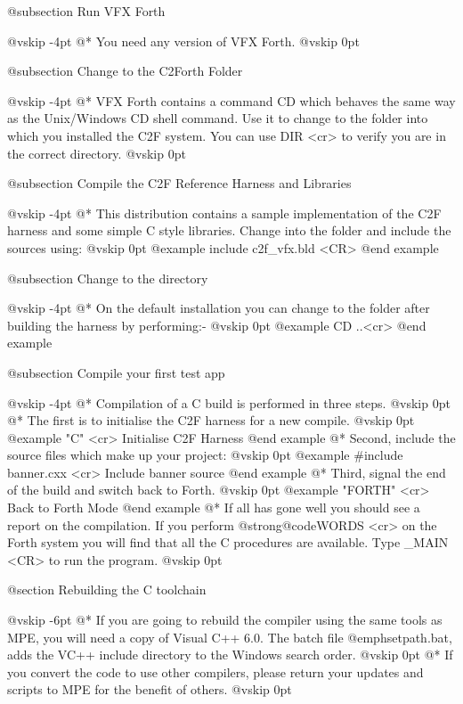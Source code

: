 @subsection Run VFX Forth


@vskip -4pt
@*
You need any version of VFX Forth.
@vskip 0pt

@subsection Change to the C2Forth Folder


@vskip -4pt
@*
VFX Forth contains a command CD which behaves the same way as the
Unix/Windows CD shell command. Use it to change to the folder
into which you installed the C2F system. You can use DIR <cr> to
verify you are in the correct directory.
@vskip 0pt

@subsection Compile the C2F Reference Harness and Libraries


@vskip -4pt
@*
This distribution contains a sample implementation of the C2F
harness and some simple C style libraries. Change into the \HARNESS
folder and include the sources using:
@vskip 0pt
@example
  include c2f_vfx.bld <CR> @end example

@subsection Change to the \TESTS directory


@vskip -4pt
@*
On the default installation you can change to the \TESTS folder
after building the harness by performing:-
@vskip 0pt
@example
  CD ..\TESTS <cr> @end example

@subsection Compile your first test app


@vskip -4pt
@*
Compilation of a C build is performed in three steps.
@vskip 0pt
@*
The first is to initialise the C2F harness for a new compile.
@vskip 0pt
@example
  "C" <cr>                        Initialise C2F Harness @end example
@*
Second, include the source files which make up your project:
@vskip 0pt
@example
  #include banner.cxx <cr>        Include banner source @end example
@*
Third, signal the end of the build and switch back to Forth.
@vskip 0pt
@example
  "FORTH" <cr>                    Back to Forth Mode @end example
@*
If all has gone well you should see a report on the compilation.
If you perform @strong{@code{WORDS <cr>}} on the Forth system you will find that
all the C procedures are available. Type _MAIN <CR> to run the
program.
@vskip 0pt

@section Rebuilding the C toolchain


@vskip -6pt
@*
If you are going to rebuild the compiler using the same
tools as MPE, you will need a copy of Visual C++ 6.0. The
batch file @emph{setpath.bat}, adds the VC++ include directory
to the Windows search order.
@vskip 0pt
@*
If you convert the code to use other compilers, please return
your updates and scripts to MPE for the benefit of others.
@vskip 0pt

